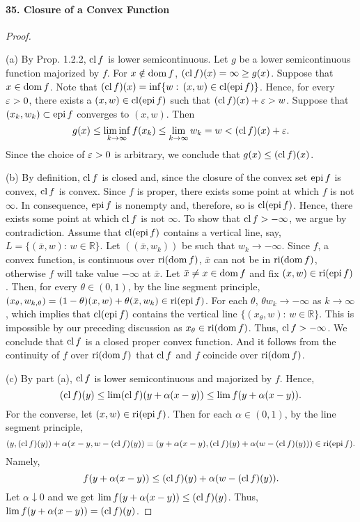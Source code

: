   \paragraph{35. Closure of a Convex Function}
  \begin{proof}
    $\,$\par
    (a) By Prop. 1.2.2, $\operatorname{cl} f$ is lower semicontinuous. Let $g$ be a lower
    semicontinuous function majorized by $f$. For $x\notin\operatorname{dom} f$, $(\operatorname{cl} f)(x)
    =\infty\ge g(x)$. Suppose that $x\in\operatorname{dom} f$. Note that $(\operatorname{cl} f)(x)=\inf\{
    w:\,(x,w)\in\operatorname{cl}(\operatorname{epi} f)\}$. Hence, for every $\varepsilon>0$, there exists a
    $(x,w)\in\operatorname{cl}(\operatorname{epi} f)$ such that $(\operatorname{cl} f)(x)+\varepsilon>w$. Suppose that $(x_k,
    w_k)\subset\operatorname{epi} f$ converges to $(x,w)$. Then
    \[
      g(x)\le\liminf_{k\to\infty}f(x_k)\le\lim_{k\to\infty}w_k
      =w < (\operatorname{cl} f)(x)+\varepsilon.
    \]
    Since the choice of $\varepsilon>0$ is arbitrary, we conclude that $g(x)\le(\operatorname{cl} f)
    (x)$.\par
    (b) By definition, $\operatorname{cl} f$ is closed and, since the closure of the convex
    set $\operatorname{epi} f$ is convex, $\operatorname{cl} f$ is convex. Since $f$ is proper, there 
    exists some point at which $f$ is not $\infty$. In consequence, $\operatorname{epi} f$ is
    nonempty and, therefore, so is $\operatorname{cl}(\operatorname{epi} f)$. Hence, there exists some 
    point at which $\operatorname{cl} f$ is not $\infty$. To show that $\operatorname{cl} f>-\infty$, we 
    argue by contradiction. Assume that $\operatorname{cl}(\operatorname{epi} f)$ contains a vertical line,
    say, $L=\{(\bar{x},w):\, w\in\mathbb{R}\}$. Let $((\bar{x},w_k))$ be such
    that $w_k\to-\infty$. Since $f$, a convex function, is continuous over
    $\operatorname{ri}(\operatorname{dom} f)$, $\bar{x}$ can not be in $\operatorname{ri}(\operatorname{dom} f)$, otherwise $f$ will 
    take value $-\infty$ at $\bar{x}$. Let $\bar{x}\ne x\in\operatorname{dom} f$ and fix $(x,
    w)\in\operatorname{ri}(\operatorname{epi} f)$. Then, for every $\theta\in(0,1)$, by the line segment
    principle, $(x_{\theta},w_{k,\theta})=(1-\theta)(x,w)+\theta(\bar{x},w_k)
    \in\operatorname{ri}(\operatorname{epi} f)$. For each $\theta$, $\theta w_k\to-\infty$ as $k\to\infty$,
    which implies that $\operatorname{cl}(\operatorname{epi} f)$ contains the vertical line $\{(x_\theta,w)
    :\,w\in\mathbb{R}\}$. This is impossible by our preceding discussion as
    $x_\theta\in\operatorname{ri}(\operatorname{dom} f)$. Thus, $\operatorname{cl} f>-\infty$. We conclude that $\operatorname{cl} f$ 
    is a closed proper convex function. And it follows from the continuity of
    $f$ over $\operatorname{ri}(\operatorname{dom} f)$ that $\operatorname{cl} f$ and $f$ coincide over $\operatorname{ri}(\operatorname{dom} f)$.
    \par
    (c) By part (a), $\operatorname{cl} f$ is lower semicontinuous and majorized by $f$. 
    Hence,
    \[
      (\operatorname{cl} f)(y)\le\lim(\operatorname{cl} f)(y+\alpha(x-y))\le\lim f(y+\alpha(x-y)).
    \]
    For the converse, let $(x,w)\in\operatorname{ri}(\operatorname{epi} f)$. Then for each $\alpha\in
    (0,1)$, by the line segment principle,
    \[
      (y, (\operatorname{cl} f)(y))+\alpha(x-y, w-(\operatorname{cl} f)(y))=
      (y+\alpha(x-y), (\operatorname{cl} f)(y)+\alpha(w-(\operatorname{cl} f)(y)))\in
      \operatorname{ri}(\operatorname{epi} f).
    \]
    Namely,
    \[
      f(y+\alpha(x-y))\le
      (\operatorname{cl} f)(y)+\alpha(w-(\operatorname{cl} f)(y)).
    \]
    Let $\alpha\downarrow 0$ and we get $\lim f(y+\alpha(x-y))\le(\operatorname{cl} f)(y)$.
    Thus, $\lim f(y+\alpha(x-y))=(\operatorname{cl} f)(y)$.
  \end{proof}
